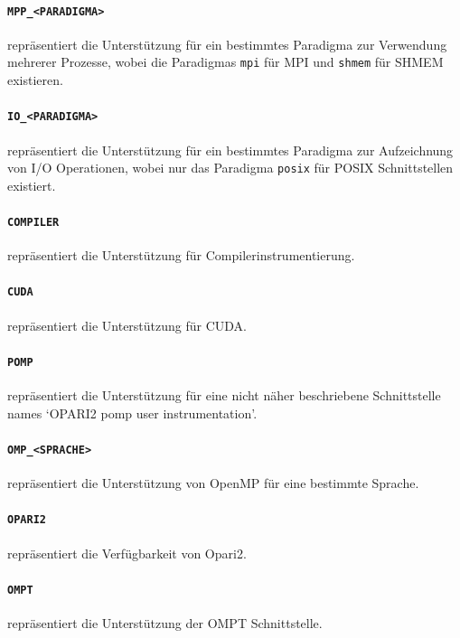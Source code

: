 \documentclass[german,proseminar,hyperref,utf8,lof]{zihpub}
\begin{document}
    \paragraph{\texttt{MPP\_<PARADIGMA>}} repräsentiert die Unterstützung für ein bestimmtes Paradigma zur
    Verwendung mehrerer Prozesse, wobei die Paradigmas \texttt{mpi} für MPI und \texttt{shmem} für SHMEM existieren.

    \paragraph{\texttt{IO\_<PARADIGMA>}} repräsentiert die Unterstützung für ein bestimmtes Paradigma zur
    Aufzeichnung von I/O Operationen, wobei nur das Paradigma \texttt{posix} für POSIX Schnittstellen existiert.

    \paragraph{\texttt{COMPILER}} repräsentiert die Unterstützung für Compilerinstrumentierung.

    \paragraph{\texttt{CUDA}} repräsentiert die Unterstützung für CUDA.
    
    \paragraph{\texttt{POMP}} repräsentiert die Unterstützung für eine nicht näher beschriebene Schnittstelle
    names `OPARI2 pomp user instrumentation'.

    \paragraph{\texttt{OMP\_<SPRACHE>}} repräsentiert die Unterstützung von OpenMP für eine bestimmte Sprache.

    \paragraph{\texttt{OPARI2}} repräsentiert die Verfügbarkeit von Opari2.

    \paragraph{\texttt{OMPT}} repräsentiert die Unterstützung der OMPT Schnittstelle.
\end{document}
